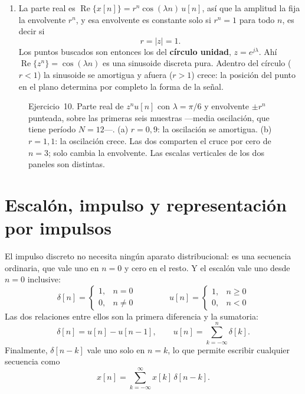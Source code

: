 \documentclass[10pt,a4paper]{article}
\newcommand{\tema}[1]{%
  \bigskip
  \section*{#1}
  \vspace{-0.6em}
}
\begin{document}
\begin{enumerate}
		Para la del inciso (b) el argumento es el opuesto. El factor $(1{,}1)^n$ crece sin
		cota, así que los términos de la suma no tienden a cero y la energía diverge. Tampoco
		hay potencia finita: al promediar $|x[n]|^2$ sobre una ventana de $2N+1$ muestras, el
		numerador crece como $(1{,}21)^N$ mientras el denominador crece solo como $N$, de modo
		que el cociente también diverge. Es una secuencia que no es \textbf{ni de energía ni de
		potencia}.

		Vale aclarar por qué el enunciado pide la versión causal $z^n u[n]$: si la secuencia
		estuviera definida para todo entero, el caso (a) tendría problemas del otro lado, ya
		que $(0{,}9)^n$ crece sin cota cuando $n\to-\infty$, y ninguna de las dos sería de
		energía.

		\item La parte real es
		$\operatorname{Re}\{x[n]\} = r^n\cos(\lambda n)\,u[n]$, así que la amplitud la fija la
		envolvente $r^n$, y esa envolvente es constante solo si $r^n=1$ para todo $n$, es decir
		si
		\[
			r = |z| = 1 .
		\]
		Los puntos buscados son entonces los del \textbf{círculo unidad}, $z=e^{j\lambda}$.
		Ahí $\operatorname{Re}\{z^n\}=\cos(\lambda n)$ es una sinusoide discreta pura. Adentro
		del círculo ($r<1$) la sinusoide se amortigua y afuera ($r>1$) crece: la posición del
		punto en el plano determina por completo la forma de la señal.
	\end{enumerate}

	\begin{figure}[H]
		\centering
		
		\caption{Ejercicio~10. Parte real de $z^n u[n]$ con $\lambda=\pi/6$ y
		envolvente $\pm r^n$ punteada, sobre las primeras seis muestras ---media
		oscilación, que tiene período $N=12$---. (a) $r=0{,}9$: la oscilación se
		amortigua. (b) $r=1{,}1$: la oscilación crece. Las dos comparten el cruce por
		cero de $n=3$; solo cambia la envolvente. Las escalas verticales de los dos
		paneles son distintas.}
		\label{fig:sol_ej10}
	\end{figure}

	\tema{Escalón, impulso y representación por impulsos}

	El impulso discreto no necesita ningún aparato distribucional: es una secuencia
	ordinaria, que vale uno en $n=0$ y cero en el resto. Y el escalón vale uno desde
	$n=0$ inclusive:
	\[
		\delta[n]=\begin{cases}1,& n=0\\ 0,& n\neq0\end{cases}
		\qquad\qquad
		u[n]=\begin{cases}1,& n\geq0\\ 0,& n<0\end{cases}
	\]
	Las dos relaciones entre ellos son la primera diferencia y la sumatoria:
	\[
		\delta[n]=u[n]-u[n-1],
		\qquad
		u[n]=\sum_{k=-\infty}^{n}\delta[k].
	\]
	Finalmente, $\delta[n-k]$ vale uno solo en $n=k$, lo que permite escribir cualquier
	secuencia como
	\[
		x[n]=\sum_{k=-\infty}^{\infty}x[k]\,\delta[n-k].
	\]
\end{document}

